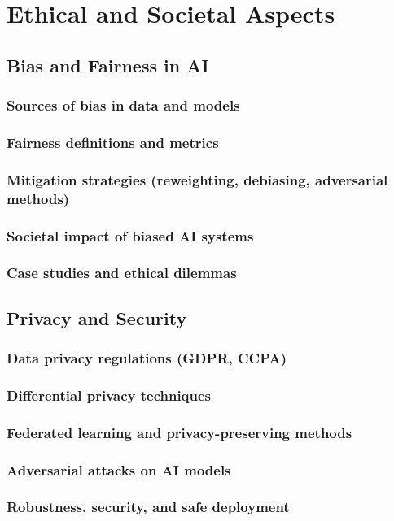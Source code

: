 ﻿\chapter{Ethical and Societal Aspects}
\section{Bias and Fairness in AI}
\subsection{Sources of bias in data and models}
\subsection{Fairness definitions and metrics}
\subsection{Mitigation strategies (reweighting, debiasing, adversarial methods)}
\subsection{Societal impact of biased AI systems}
\subsection{Case studies and ethical dilemmas}

\section{Privacy and Security}
\subsection{Data privacy regulations (GDPR, CCPA)}
\subsection{Differential privacy techniques}
\subsection{Federated learning and privacy-preserving methods}
\subsection{Adversarial attacks on AI models}
\subsection{Robustness, security, and safe deployment}

